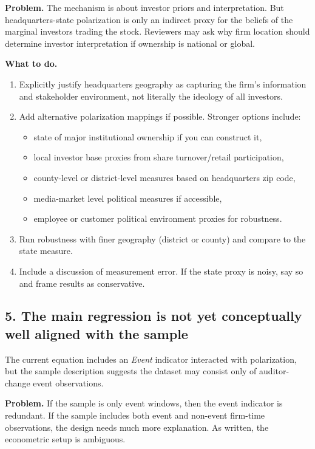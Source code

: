 \documentclass[12pt]{article}
\begin{document}
\textbf{Problem.} The mechanism is about investor priors and interpretation. But headquarters-state polarization is only an indirect proxy for the beliefs of the marginal investors trading the stock. Reviewers may ask why firm location should determine investor interpretation if ownership is national or global.

\textbf{What to do.}
\begin{enumerate}[leftmargin=2em]
    \item Explicitly justify headquarters geography as capturing the firm's information and stakeholder environment, not literally the ideology of all investors.
    \item Add alternative polarization mappings if possible. Stronger options include:
    \begin{itemize}[leftmargin=2em]
        \item state of major institutional ownership if you can construct it,
        \item local investor base proxies from share turnover/retail participation,
        \item county-level or district-level measures based on headquarters zip code,
        \item media-market level political measures if accessible,
        \item employee or customer political environment proxies for robustness.
    \end{itemize}
    \item Run robustness with finer geography (district or county) and compare to the state measure.
    \item Include a discussion of measurement error. If the state proxy is noisy, say so and frame results as conservative.
\end{enumerate}

\subsection{5. The main regression is not yet conceptually well aligned with the sample}
The current equation includes an \textit{Event} indicator interacted with polarization, but the sample description suggests the dataset may consist only of auditor-change event observations.

\textbf{Problem.} If the sample is only event windows, then the event indicator is redundant. If the sample includes both event and non-event firm-time observations, the design needs much more explanation. As written, the econometric setup is ambiguous.
\end{document}
